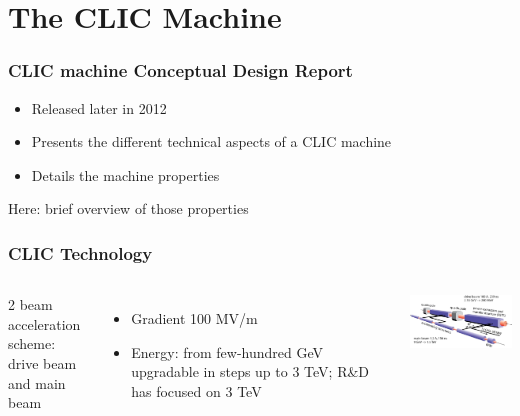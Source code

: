 \documentclass{beamer}
\begin{document}
\section[CLIC]{The CLIC Machine}
\begin{frame}
\frametitle{CLIC machine Conceptual Design Report}
\begin{itemize}
  \item Released later in 2012
  \item Presents the different technical aspects of a CLIC machine
  \item Details the machine properties
\end{itemize}
Here: brief overview of those properties
\end{frame}
\begin{frame}
\frametitle{CLIC Technology}
\begin{columns}[c]
\column{6cm}
2 beam acceleration scheme:\\ drive beam and main beam
\begin{itemize}
  \item Gradient 100 MV/m
  \item Energy: from few-hundred GeV upgradable in steps up to 3 TeV; R\&D has
  focused on 3 TeV
\end{itemize}
\column{6cm}
\includegraphics[width=6cm]{clicacceleration.png}
\end{columns}
\end{frame}
\end{document}
